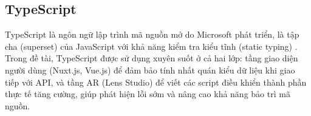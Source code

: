 \subsection{TypeScript}
TypeScript là ngôn ngữ lập trình mã nguồn mở do Microsoft phát 
triển, là tập cha (superset) của JavaScript với khả năng kiểm 
tra kiểu tĩnh (static typing) \cite{typescript_docs}. Trong đề 
tài, TypeScript được sử dụng xuyên suốt ở cả hai lớp: tầng 
giao diện người dùng (Nuxt.js, Vue.js) để đảm bảo tính nhất 
quán kiểu dữ liệu khi giao tiếp với API, và tầng AR (Lens 
Studio) để viết các script điều khiển thành phần thực tế tăng 
cường, giúp phát hiện lỗi sớm và nâng cao khả năng bảo trì 
mã nguồn.
